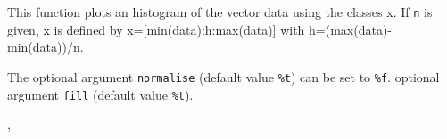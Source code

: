 \begin{mandescription}
  This function plots an histogram of the vector data using the
  classes x. If \verb+n+ is given, x is defined by x=[min(data):h:max(data)] with
  h=(max(data)-min(data))/n.

  The optional argument \verb+normalise+ (default value \verb+%t+) can be set to
  \verb+%f+.
  optional argument \verb+fill+ (default value \verb+%t+).


  
\end{mandescription}

\begin{examples}
  \begin{program}
  \end{program}

\end{examples}

\begin{manseealso}
  , 
\end{manseealso}


